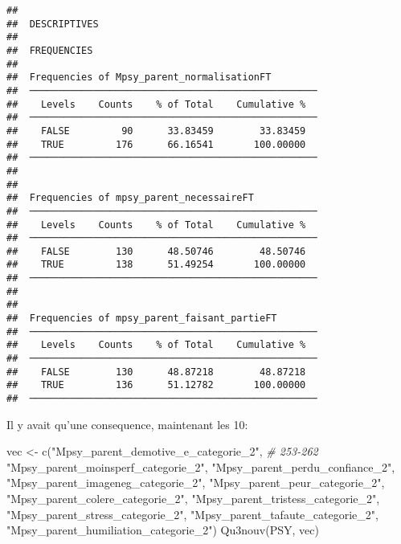\documentclass[
]{article}
\newenvironment{Shaded}{\begin{snugshade}}{\end{snugshade}}
\newcommand{\CommentTok}[1]{\textcolor[rgb]{0.56,0.35,0.01}{\textit{#1}}}
\newcommand{\FunctionTok}[1]{\textcolor[rgb]{0.00,0.00,0.00}{#1}}
\newcommand{\NormalTok}[1]{#1}
\newcommand{\OtherTok}[1]{\textcolor[rgb]{0.56,0.35,0.01}{#1}}
\newcommand{\StringTok}[1]{\textcolor[rgb]{0.31,0.60,0.02}{#1}}
\begin{document}
\begin{verbatim}
## 
##  DESCRIPTIVES
## 
##  FREQUENCIES
## 
##  Frequencies of Mpsy_parent_normalisationFT         
##  ────────────────────────────────────────────────── 
##    Levels    Counts    % of Total    Cumulative %   
##  ────────────────────────────────────────────────── 
##    FALSE         90      33.83459        33.83459   
##    TRUE         176      66.16541       100.00000   
##  ────────────────────────────────────────────────── 
## 
## 
##  Frequencies of mpsy_parent_necessaireFT            
##  ────────────────────────────────────────────────── 
##    Levels    Counts    % of Total    Cumulative %   
##  ────────────────────────────────────────────────── 
##    FALSE        130      48.50746        48.50746   
##    TRUE         138      51.49254       100.00000   
##  ────────────────────────────────────────────────── 
## 
## 
##  Frequencies of mpsy_parent_faisant_partieFT        
##  ────────────────────────────────────────────────── 
##    Levels    Counts    % of Total    Cumulative %   
##  ────────────────────────────────────────────────── 
##    FALSE        130      48.87218        48.87218   
##    TRUE         136      51.12782       100.00000   
##  ──────────────────────────────────────────────────
\end{verbatim}

Il y avait qu'une consequence, maintenant les 10:

\begin{Shaded}
\begin{Highlighting}[]
\NormalTok{vec }\OtherTok{\textless{}{-}} \FunctionTok{c}\NormalTok{(}\StringTok{"Mpsy\_parent\_demotive\_e\_categorie\_2"}\NormalTok{,    }\CommentTok{\# 253{-}262}
         \StringTok{"Mpsy\_parent\_moinsperf\_categorie\_2"}\NormalTok{,}
         \StringTok{"Mpsy\_parent\_perdu\_confiance\_2"}\NormalTok{,}
         \StringTok{"Mpsy\_parent\_imageneg\_categorie\_2"}\NormalTok{,}
         \StringTok{"Mpsy\_parent\_peur\_categorie\_2"}\NormalTok{,}
         \StringTok{"Mpsy\_parent\_colere\_categorie\_2"}\NormalTok{,}
         \StringTok{"Mpsy\_parent\_tristess\_categorie\_2"}\NormalTok{,}
         \StringTok{"Mpsy\_parent\_stress\_categorie\_2"}\NormalTok{,}
         \StringTok{"Mpsy\_parent\_tafaute\_categorie\_2"}\NormalTok{,}
         \StringTok{"Mpsy\_parent\_humiliation\_categorie\_2"}\NormalTok{)}
\FunctionTok{Qu3nouv}\NormalTok{(PSY, vec)}
\end{Highlighting}
\end{Shaded}
\end{document}
